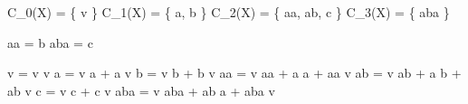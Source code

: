 
C_{0}(X) = \{ v \}
C_{1}(X) = \{ a, b \}
C_{2}(X) = \{ aa, ab, c \}
C_{3}(X) = \{ aba \}

\partial aa = b
\partial aba = c

\Delta v = v \otimes v
\Delta a = v \otimes a + a \otimes v
\Delta b = v \otimes b + b \otimes v
\Delta aa = v \otimes aa + a \otimes a + aa \otimes v
\Delta ab = v \otimes ab + a \otimes b + ab \otimes v
\Delta c = v \otimes c + c \otimes v
\Delta aba = v \otimes aba + ab \otimes a + aba \otimes v